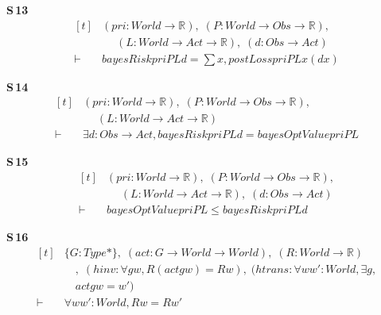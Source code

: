 \noindent\textbf{S\,13}\quad{}
{\footnotesize\[ \begin{aligned}[t]
&(\mathit{pri} : \mathit{World} \to \mathbb{R} ),\; (\mathit{P} : \mathit{World} \to \mathit{Obs} \to \mathbb{R} ),\\
&\quad \; (\mathit{L} : \mathit{World} \to \mathit{Act} \to \mathbb{R} ),\; (\mathit{d} : \mathit{Obs} \to \mathit{Act})\\
\vdash\;&\mathit{bayesRisk} \mathit{pri} \mathit{P} \mathit{L} \mathit{d} = \textstyle\sum \mathit{x}, \mathit{postLoss} \mathit{pri} \mathit{P} \mathit{L} \mathit{x} (\mathit{d} \mathit{x})
\end{aligned} \]}

\noindent\textbf{S\,14}\quad{}
{\footnotesize\[ \begin{aligned}[t]
&(\mathit{pri} : \mathit{World} \to \mathbb{R} ),\; (\mathit{P} : \mathit{World} \to \mathit{Obs} \to \mathbb{R} ),\\
&\quad \; (\mathit{L} : \mathit{World} \to \mathit{Act} \to \mathbb{R} )\\
\vdash\;&\exists \mathit{d} : \mathit{Obs} \to \mathit{Act}, \mathit{bayesRisk} \mathit{pri} \mathit{P} \mathit{L} \mathit{d} = \mathit{bayesOptValue} \mathit{pri} \mathit{P} \mathit{L}
\end{aligned} \]}

\noindent\textbf{S\,15}\quad{}
{\footnotesize\[ \begin{aligned}[t]
&(\mathit{pri} : \mathit{World} \to \mathbb{R} ),\; (\mathit{P} : \mathit{World} \to \mathit{Obs} \to \mathbb{R} ),\\
&\quad \; (\mathit{L} : \mathit{World} \to \mathit{Act} \to \mathbb{R} ),\; (\mathit{d} : \mathit{Obs} \to \mathit{Act})\\
\vdash\;&\mathit{bayesOptValue} \mathit{pri} \mathit{P} \mathit{L} \leq \mathit{bayesRisk} \mathit{pri} \mathit{P} \mathit{L} \mathit{d}
\end{aligned} \]}

\noindent\textbf{S\,16}\quad{}
{\footnotesize\[ \begin{aligned}[t]
&\{ \mathit{G} : \mathit{Type}*\},\; (\mathit{act} : \mathit{G} \to \mathit{World} \to \mathit{World}),\; (\mathit{R} : \mathit{World} \to \mathbb{R} )\\
&\quad ,\; (\mathit{hinv} : \forall \mathit{g} \mathit{w}, \mathit{R} (\mathit{act} \mathit{g} \mathit{w}) = \mathit{R} \mathit{w}),\; (\mathit{htrans} : \forall \mathit{w} \mathit{w'} : \mathit{World}, \exists \mathit{g},\\
&\quad \mathit{act} \mathit{g} \mathit{w} = \mathit{w'})\\
\vdash\;&\forall \mathit{w} \mathit{w'} : \mathit{World}, \mathit{R} \mathit{w} = \mathit{R} \mathit{w'}
\end{aligned} \]}

